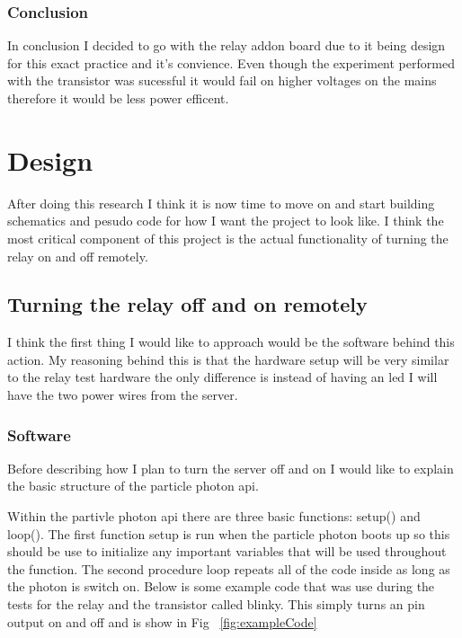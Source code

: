 \documentclass{article}
\begin{document}
\subsubsection{Conclusion}
In conclusion I decided to go with the relay addon board due to it being design for this exact practice and
it's convience. Even though the experiment performed with the transistor was sucessful it would fail on
higher voltages on the mains therefore it would be less power efficent.

\section{Design}

After doing this research I think it is now time to move on and start building schematics and pesudo code
for how I want the project to look like. I think the most critical component of this project is the
actual functionality of turning the relay on and off remotely.

\subsection{Turning the relay off and on remotely}
I think the first thing I would like to approach would be the software behind this action. My reasoning
behind this is that the hardware setup will be very similar to the relay test hardware the only difference
is instead of having an led I will have the two power wires from the server.

\subsubsection{Software}
Before describing how I plan to turn the server off and on I would like to explain the basic structure of
the particle photon api.

Within the partivle photon api there are three basic functions: setup() and loop(). The first function
setup is run when the particle photon boots up so this should be use to initialize any important variables
that will be used throughout the function. The second procedure loop repeats all of the code inside as long
as the photon is switch on. Below is some example code that was use during the tests for the relay and the
transistor called blinky. This simply turns an pin output on and off and is show in Fig ~\ref{fig:exampleCode}
\end{document}
